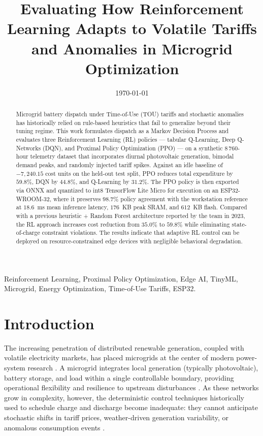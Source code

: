 \documentclass[conference]{IEEEtran}
\title{Evaluating How Reinforcement Learning Adapts to Volatile Tariffs and Anomalies in Microgrid Optimization}
\author{
\IEEEauthorblockA{Creative Experience: Transformative Project II\\
Bachelor's in Computer Science -- PUCPR
\\[3ex]
Class \red{X} -- Team \red{N} \\
Tarso Bertolini, Eduardo Contin, Giancarlo, Paulo, Bell \\
{\tt\small \{\red{tarso.bertolini}, \red{contin.eduardo}\}@pucpr.edu.br}
}
}
\date{\today}
\begin{document}
\maketitle

\begin{abstract}
Microgrid battery dispatch under Time-of-Use (TOU) tariffs and stochastic anomalies has historically relied on rule-based heuristics that fail to generalize beyond their tuning regime. This work formulates dispatch as a Markov Decision Process and evaluates three Reinforcement Learning (RL) policies --- tabular Q-Learning, Deep Q-Networks (DQN), and Proximal Policy Optimization (PPO) --- on a synthetic 8\,760-hour telemetry dataset that incorporates diurnal photovoltaic generation, bimodal demand peaks, and randomly injected tariff spikes. Against an idle baseline of $-7{,}240.15$ cost units on the held-out test split, PPO reduces total expenditure by $59.8\%$, DQN by $44.8\%$, and Q-Learning by $31.2\%$. The PPO policy is then exported via ONNX and quantized to int8 TensorFlow Lite Micro for execution on an ESP32-WROOM-32, where it preserves $98.7\%$ policy agreement with the workstation reference at $18.6$~ms mean inference latency, $176$~KB peak SRAM, and $612$~KB flash. Compared with a previous heuristic + Random Forest architecture reported by the team in 2023, the RL approach increases cost reduction from $35.0\%$ to $59.8\%$ while eliminating state-of-charge constraint violations. The results indicate that adaptive RL control can be deployed on resource-constrained edge devices with negligible behavioral degradation.
\end{abstract}

\begin{IEEEkeywords}
Reinforcement Learning, Proximal Policy Optimization, Edge AI, TinyML, Microgrid, Energy Optimization, Time-of-Use Tariffs, ESP32.
\end{IEEEkeywords}

\section{Introduction}
\label{sec:intro}

The increasing penetration of distributed renewable generation, coupled with volatile electricity markets, has placed microgrids at the center of modern power-system research \cite{hua2019}. A microgrid integrates local generation (typically photovoltaic), battery storage, and load within a single controllable boundary, providing operational flexibility and resilience to upstream disturbances \cite{liu2020}. As these networks grow in complexity, however, the deterministic control techniques historically used to schedule charge and discharge become inadequate: they cannot anticipate stochastic shifts in tariff prices, weather-driven generation variability, or anomalous consumption events \cite{lu2019}.
\end{document}
